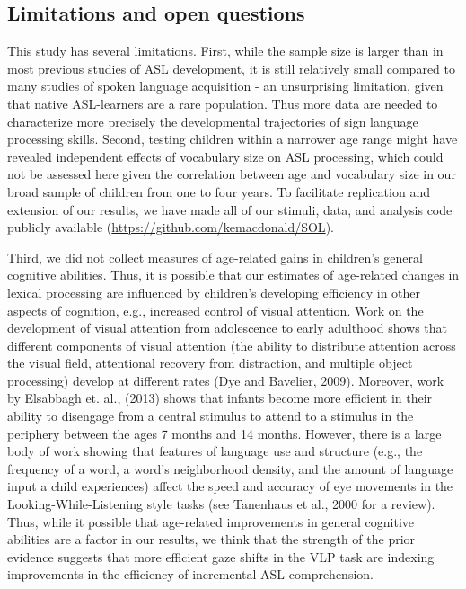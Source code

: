 \documentclass[oneside]{report}
\begin{document}
\hypertarget{limitations-and-open-questions}{%
\subsection{Limitations and open
questions}\label{limitations-and-open-questions}}

This study has several limitations. First, while the sample size is
larger than in most previous studies of ASL development, it is still
relatively small compared to many studies of spoken language acquisition
- an unsurprising limitation, given that native ASL-learners are a rare
population. Thus more data are needed to characterize more precisely the
developmental trajectories of sign language processing skills. Second,
testing children within a narrower age range might have revealed
independent effects of vocabulary size on ASL processing, which could
not be assessed here given the correlation between age and vocabulary
size in our broad sample of children from one to four years. To
facilitate replication and extension of our results, we have made all of
our stimuli, data, and analysis code publicly available
(\url{https://github.com/kemacdonald/SOL}).

Third, we did not collect measures of age-related gains in children's
general cognitive abilities. Thus, it is possible that our estimates of
age-related changes in lexical processing are influenced by children's
developing efficiency in other aspects of cognition, e.g., increased
control of visual attention. Work on the development of visual attention
from adolescence to early adulthood shows that different components of
visual attention (the ability to distribute attention across the visual
field, attentional recovery from distraction, and multiple object
processing) develop at different rates (Dye and Bavelier, 2009).
Moreover, work by Elsabbagh et. al., (2013) shows that infants become
more efficient in their ability to disengage from a central stimulus to
attend to a stimulus in the periphery between the ages 7 months and 14
months. However, there is a large body of work showing that features of
language use and structure (e.g., the frequency of a word, a word's
neighborhood density, and the amount of language input a child
experiences) affect the speed and accuracy of eye movements in the
Looking-While-Listening style tasks (see Tanenhaus et al., 2000 for a
review). Thus, while it possible that age-related improvements in
general cognitive abilities are a factor in our results, we think that
the strength of the prior evidence suggests that more efficient gaze
shifts in the VLP task are indexing improvements in the efficiency of
incremental ASL comprehension.
\end{document}
